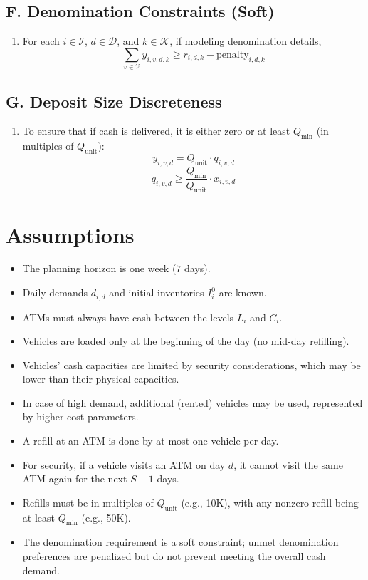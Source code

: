 \documentclass[11pt]{article}
\begin{document}
\subsection*{F. Denomination Constraints (Soft)}
\begin{enumerate}[label=\textbf{(F\arabic*)}]
    \item For each \(i \in \mathcal{I}\), \(d \in \mathcal{D}\), and \(k \in \mathcal{K}\), if modeling denomination details,
    \[
    \sum_{v \in \mathcal{V}} y_{i,v,d,k} \ge r_{i,d,k} - \text{penalty}_{i,d,k}
    \]
\end{enumerate}

\subsection*{G. Deposit Size Discreteness}
\begin{enumerate}[label=\textbf{(G\arabic*)}]
    \item To ensure that if cash is delivered, it is either zero or at least \(Q_{\min}\) (in multiples of \(Q_{\text{unit}}\)):
    \[
        y_{i,v,d} = Q_{\text{unit}} \cdot q_{i,v,d}
    \]
    \[
        q_{i,v,d} \ge \frac{Q_{\min}}{Q_{\text{unit}}}\cdot x_{i,v,d}
    \]
\end{enumerate}

\section*{Assumptions}
\begin{itemize}[leftmargin=1.5cm]
    \item The planning horizon is one week (\(7\) days).
    \item Daily demands \(d_{i,d}\) and initial inventories \(I_i^0\) are known.
    \item ATMs must always have cash between the levels \(L_i\) and \(C_i\).
    \item Vehicles are loaded only at the beginning of the day (no mid-day refilling).
    \item Vehicles' cash capacities are limited by security considerations, which may be lower than their physical capacities.
    \item In case of high demand, additional (rented) vehicles may be used, represented by higher cost parameters.
    \item A refill at an ATM is done by at most one vehicle per day.
    \item For security, if a vehicle visits an ATM on day \(d\), it cannot visit the same ATM again for the next \(S-1\) days.
    \item Refills must be in multiples of \(Q_{\text{unit}}\) (e.g., 10K), with any nonzero refill being at least \(Q_{\min}\) (e.g., 50K).
    \item The denomination requirement is a soft constraint; unmet denomination preferences are penalized but do not prevent meeting the overall cash demand.
\end{itemize}
\end{document}

